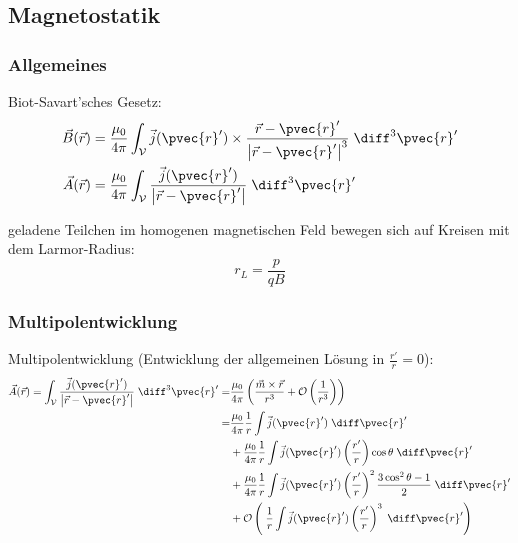 \documentclass[11pt]{article}
\numberwithin{equation}{section}
\begin{document}
    \subsection{Magnetostatik}
      \subsubsection{Allgemeines}
        Biot-Savart'sches Gesetz:
        \begin{equation}
          \begin{aligned}
            \vec{B}(\vec{r}) &= \frac{\mu_0}{4\pi}\int_{\mathcal{V}} \vec{j}(\pvec{r}')\times\frac{\vec{r}-\pvec{r}'}{\left|\vec{r}-\pvec{r}'\right|^3}\;\diff^3\pvec{r}' \\
            \vec{A}(\vec{r}) &= \frac{\mu_0}{4\pi} \int_{\mathcal{V}} \frac{\vec{j}(\pvec{r}')}{\left|\vec{r}-\pvec{r}'\right|} \;\diff^3\pvec{r}'
          \end{aligned}
        \end{equation}

        geladene Teilchen im homogenen magnetischen Feld bewegen sich auf Kreisen mit dem Larmor-Radius:
        \begin{equation}
          r_L = \frac{p}{qB}
        \end{equation}

      \subsubsection{Multipolentwicklung}
        Multipolentwicklung (Entwicklung der allgemeinen Lösung in $\frac{r'}{r}=0$):
        \begin{equation}
          \begin{aligned}
            \vec{A}(\vec{r}) = \int_{\mathcal{V}} \frac{\vec{j}(\pvec{r}')}{\left|\vec{r}-\pvec{r}'\right|} \;\diff^3\pvec{r}'
            =& \frac{\mu_0}{4\pi} \left(\frac{\vec{m}\times\vec{r}}{r^3} + \mathcal{O}\left(\frac{1}{r^3}\right)\right) \\
            =& \frac{\mu_0}{4\pi}\frac{1}{r}\int\vec{j}(\pvec{r}')\;\diff \pvec{r}' \\
            &+ \frac{\mu_0}{4\pi}\frac{1}{r}\int\vec{j}(\pvec{r}')\left(\frac{r'}{r}\right)\cos\theta\;\diff \pvec{r}' \\
            &+ \frac{\mu_0}{4\pi}\frac{1}{r}\int\vec{j}(\pvec{r}')\left(\frac{r'}{r}\right)^2\frac{3\cos^2\theta-1}{2}\;\diff \pvec{r}' \\
            &+ \mathcal{O}\left(\;\frac{1}{r}\int\vec{j}(\pvec{r}')\left(\frac{r'}{r}\right)^3 \;\diff \pvec{r}'\right) \\
          \end{aligned}
        \end{equation}
\end{document}
